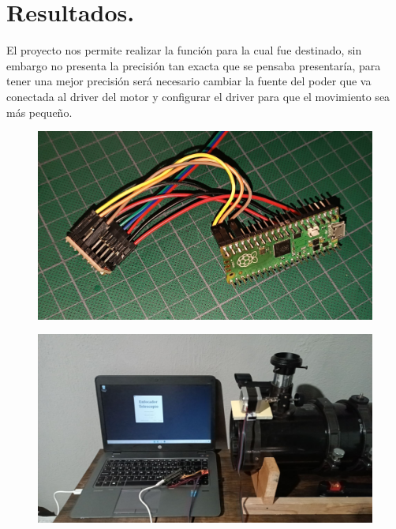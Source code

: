 \documentclass{article}
\begin{document}
    \section{Resultados.}
        El proyecto nos permite realizar la función para la cual fue destinado, sin embargo no presenta la precisión tan exacta que se pensaba presentaría, para tener una mejor precisión será necesario cambiar la fuente del poder que va conectada al driver del motor y configurar el driver para que el movimiento sea más pequeño.
        \begin{multicols}{2}
            \begin{figure}[H]
                \includegraphics[width=\linewidth]{i1.jpg}
            \end{figure}
            \begin{figure}[H]
                \includegraphics[width=\linewidth]{i2.jpg}
            \end{figure}
        \end{multicols}
        
\end{document}
